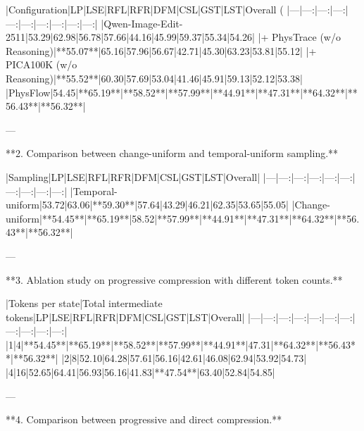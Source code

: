 \documentclass{article}
\begin{document}
|Configuration|LP|LSE|RFL|RFR|DFM|CSL|GST|LST|Overall (%
|---|---:|---:|---:|---:|---:|---:|---:|---:|---:|
|Qwen-Image-Edit-2511|53.29|62.98|56.78|57.66|44.16|45.99|59.37|55.34|54.26|
|+ PhysTrace (w/o Reasoning)|**55.07**|65.16|57.96|56.67|42.71|45.30|63.23|53.81|55.12|
|+ PICA100K (w/o Reasoning)|**55.52**|60.30|57.69|53.04|41.46|45.91|59.13|52.12|53.38|
|PhysFlow|54.45|**65.19**|**58.52**|**57.99**|**44.91**|**47.31**|**64.32**|**56.43**|**56.32**|

---

**2. Comparison between change-uniform and temporal-uniform sampling.**

{\color{orange}{
As suggested, we have compared our proposed change-uniform frame sampling strategy with conventional temporal-uniform sampling on PICABench-Superficial.
The results are reported in Table 3(c).
As shown, our change-uniform strategy improves the overall score by 1.27 points over temporal-uniform sampling.
This improvement can be attributed to its ability to capture richer transition dynamics, whereas temporal-uniform sampling may concentrate substantial visual changes between only a few consecutive sampled frames.
}}

|Sampling|LP|LSE|RFL|RFR|DFM|CSL|GST|LST|Overall|
|---|---:|---:|---:|---:|---:|---:|---:|---:|---:|
|Temporal-uniform|53.72|63.06|**59.30**|57.64|43.29|46.21|62.35|53.65|55.05|
|Change-uniform|**54.45**|**65.19**|58.52|**57.99**|**44.91**|**47.31**|**64.32**|**56.43**|**56.32**|

---

**3. Ablation study on progressive compression with different token counts.**

{\color{orange}{
As suggested, we evaluate our proposed progressive compression mechanism using different numbers of tokens per reasoning block (1, 2, and 4). The results are reported in Table 9 of Appendix C.6.
As shown, using a single token per reasoning block achieves the highest overall accuracy (56.32\%), and is adopted as the default setting in our paper.
}}

|Tokens per state|Total intermediate tokens|LP|LSE|RFL|RFR|DFM|CSL|GST|LST|Overall|
|---|---:|---:|---:|---:|---:|---:|---:|---:|---:|---:|
|1|4|**54.45**|**65.19**|**58.52**|**57.99**|**44.91**|47.31|**64.32**|**56.43**|**56.32**|
|2|8|52.10|64.28|57.61|56.16|42.61|46.08|62.94|53.92|54.73|
|4|16|52.65|64.41|56.93|56.16|41.83|**47.54**|63.40|52.84|54.85|

---

**4. Comparison between progressive and direct compression.**
\end{document}
